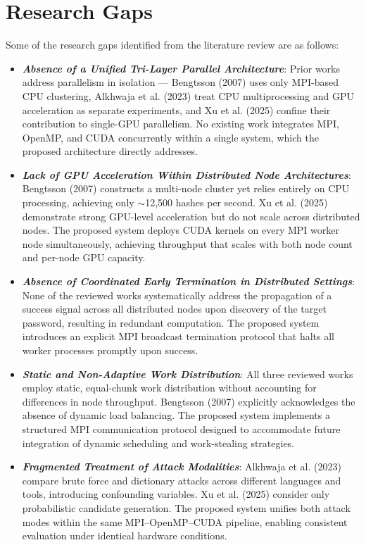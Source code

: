 \documentclass[12pt,a4paper]{article}
\begin{document}
	\section{Research Gaps}
	Some of the research gaps identified from the literature review are as follows: 
	\begin{itemize}

    \item \textit{\textbf{Absence of a Unified Tri-Layer Parallel Architecture}}: Prior works address parallelism in isolation — Bengtsson (2007) uses only MPI-based CPU clustering, Alkhwaja et al. (2023) treat CPU multiprocessing and GPU acceleration as separate experiments, and Xu et al. (2025) confine their contribution to single-GPU parallelism. No existing work integrates MPI, OpenMP, and CUDA concurrently within a single system, which the proposed architecture directly addresses.

    \item \textit{\textbf{Lack of GPU Acceleration Within Distributed Node Architectures}}: Bengtsson (2007) constructs a multi-node cluster yet relies entirely on CPU processing, achieving only $\sim$12,500 hashes per second. Xu et al. (2025) demonstrate strong GPU-level acceleration but do not scale across distributed nodes. The proposed system deploys CUDA kernels on every MPI worker node simultaneously, achieving throughput that scales with both node count and per-node GPU capacity.

    \item \textit{\textbf{Absence of Coordinated Early Termination in Distributed Settings}}: None of the reviewed works systematically address the propagation of a success signal across all distributed nodes upon discovery of the target password, resulting in redundant computation. The proposed system introduces an explicit MPI broadcast termination protocol that halts all worker processes promptly upon success.

    \item \textit{\textbf{Static and Non-Adaptive Work Distribution}}: All three reviewed works employ static, equal-chunk work distribution without accounting for differences in node throughput. Bengtsson (2007) explicitly acknowledges the absence of dynamic load balancing. The proposed system implements a structured MPI communication protocol designed to accommodate future integration of dynamic scheduling and work-stealing strategies.

    \item \textit{\textbf{Fragmented Treatment of Attack Modalities}}: Alkhwaja et al. (2023) compare brute force and dictionary attacks across different languages and tools, introducing confounding variables. Xu et al. (2025) consider only probabilistic candidate generation. The proposed system unifies both attack modes within the same MPI--OpenMP--CUDA pipeline, enabling consistent evaluation under identical hardware conditions.


\end{itemize}
\end{document}

